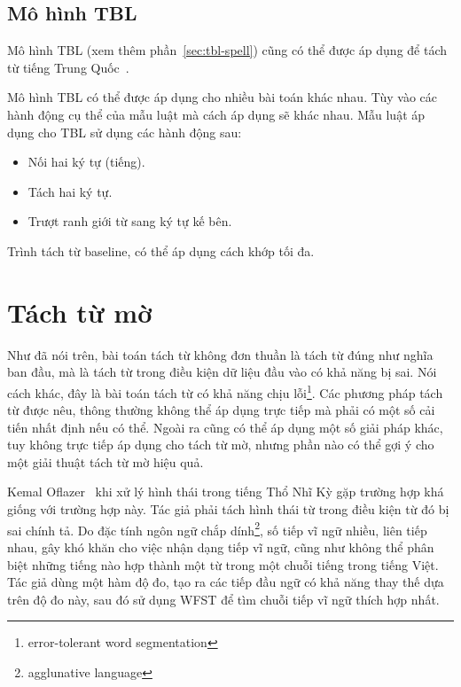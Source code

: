 \documentclass[a4paper,oneside,14pt]{extbook} %
\begin{document}


\subsection{Mô hình TBL}

Mô hình TBL (xem thêm phần~\ref{sec:tbl-spell}) cũng có thể được áp
dụng để tách từ tiếng Trung Quốc~\cite{palmer}. 

Mô hình TBL có thể được áp dụng cho nhiều bài toán khác nhau. Tùy vào
các hành động cụ thể của mẫu luật mà cách áp dụng sẽ khác nhau. Mẫu luật
áp dụng cho TBL sử dụng các hành động sau:    
\begin{itemize}
\item Nối hai ký tự (tiếng).
\item Tách hai ký tự.
\item Trượt ranh giới từ sang ký tự kế bên. 
\end{itemize}

Trình tách từ baseline, có thể áp dụng cách khớp tối đa.




\section{Tách từ mờ}

Như đã nói trên, bài toán tách từ không đơn thuần là tách từ đúng như
nghĩa ban đầu, mà là tách từ trong điều kiện dữ liệu đầu vào có khả
năng bị sai. Nói cách khác, đây là bài toán tách từ có khả năng chịu
lỗi\footnote{error-tolerant word segmentation}. Các phương pháp tách
từ được nêu, thông thường không thể áp dụng trực tiếp mà phải có một
số cải tiến nhất định nếu có thể. Ngoài ra cũng có thể áp dụng một số
giải pháp khác, tuy không trực tiếp áp dụng cho tách từ mờ, nhưng phần
nào có thể gợi ý cho một giải thuật tách từ mờ hiệu quả.

Kemal Oflazer~\cite{Oflazer} khi xử lý hình thái trong tiếng Thổ Nhĩ Kỳ gặp trường
hợp khá giống với trường hợp này. Tác giả phải tách hình thái từ
trong điều kiện từ đó bị sai chính tả. Do đặc tính
ngôn ngữ chắp dính\footnote{agglunative language}, số tiếp vĩ ngữ
nhiều, liên tiếp nhau, gây khó khăn cho việc nhận dạng tiếp vĩ ngữ,
cũng như không thể phân biệt những tiếng nào hợp thành một từ trong
một chuỗi tiếng trong tiếng Việt. Tác giả dùng một hàm độ đo, tạo ra
các tiếp đầu ngữ có khả năng thay thế dựa trên độ đo này, sau đó sử
dụng WFST để tìm chuỗi tiếp vĩ ngữ thích hợp nhất.
\end{document}
